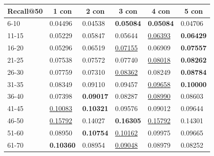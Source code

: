 \begin{table}[]
    \centering
    \begin{tabular}{|l|l|l|l|l|l|}
        \hline
        Recall@50 & \multicolumn{1}{c|}{1 con} & \multicolumn{1}{c|}{2 con} & \multicolumn{1}{c|}{3 con} & \multicolumn{1}{c|}{4 con} & \multicolumn{1}{c|}{5 con} \\ \hline
        6-10      & 0.04496                    & 0.04538                    & \textbf{0.05084}           & \textbf{0.05084}           & 0.04706                    \\ \hline
        11-15     & 0.05229                    & 0.05847                    & 0.05644                    & \underline{0.06393}        & \textbf{0.06429}           \\ \hline
        16-20     & 0.05296                    & 0.06519                    & \underline{0.07155}        & 0.06909                    & \textbf{0.07557}           \\ \hline
        21-25     & 0.07538                    & 0.07572                    & 0.07740                    & \underline{0.08018}        & \textbf{0.08262}           \\ \hline
        26-30     & 0.07759                    & 0.07310                    & \underline{0.08362}        & 0.08249                    & \textbf{0.08784}           \\ \hline
        31-35     & 0.08349                    & 0.09110                    & 0.09457                    & \underline{0.09658}        & \textbf{0.10000}           \\ \hline
        36-40     & 0.07398                    & \textbf{0.09017}           & 0.08287                    & \underline{0.08990}        & 0.08603                    \\ \hline
        41-45     & \underline{0.10083}        & \textbf{0.10321}           & 0.09576                    & 0.09012                    & 0.09644                    \\ \hline
        46-50     & \underline{0.15792}        & 0.14027                    & \textbf{0.16305}           & \underline{0.15792}        & 0.14301                    \\ \hline
        51-60     & 0.08950                    & \textbf{0.10754}           & \underline{0.10162}        & 0.09975                    & 0.09665                    \\ \hline
        61-70     & \textbf{0.10360}           & 0.08954                    & \underline{0.09048}        & 0.08979                    & 0.08252                    \\ \hline

\end{tabular}
\end{table}
